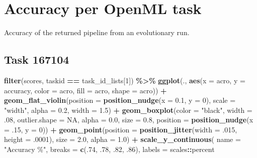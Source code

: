 \documentclass[
]{book}
\newenvironment{Shaded}{\begin{snugshade}}{\end{snugshade}}
\newcommand{\AttributeTok}[1]{\textcolor[rgb]{0.13,0.29,0.53}{#1}}
\newcommand{\ConstantTok}[1]{\textcolor[rgb]{0.56,0.35,0.01}{#1}}
\newcommand{\DecValTok}[1]{\textcolor[rgb]{0.00,0.00,0.81}{#1}}
\newcommand{\FloatTok}[1]{\textcolor[rgb]{0.00,0.00,0.81}{#1}}
\newcommand{\FunctionTok}[1]{\textcolor[rgb]{0.13,0.29,0.53}{\textbf{#1}}}
\newcommand{\NormalTok}[1]{#1}
\newcommand{\SpecialCharTok}[1]{\textcolor[rgb]{0.81,0.36,0.00}{\textbf{#1}}}
\newcommand{\StringTok}[1]{\textcolor[rgb]{0.31,0.60,0.02}{#1}}
\begin{document}
\hypertarget{accuracy-per-openml-task}{%
\section{Accuracy per OpenML task}\label{accuracy-per-openml-task}}

Accuracy of the returned pipeline from an evolutionary run.

\hypertarget{task-167104}{%
\subsection{Task 167104}\label{task-167104}}

\begin{Shaded}
\begin{Highlighting}[]
\FunctionTok{filter}\NormalTok{(scores, taskid }\SpecialCharTok{==}\NormalTok{ task\_id\_lists[}\DecValTok{1}\NormalTok{]) }\SpecialCharTok{\%\textgreater{}\%}
  \FunctionTok{ggplot}\NormalTok{(., }\FunctionTok{aes}\NormalTok{(}\AttributeTok{x =}\NormalTok{ acro, }\AttributeTok{y =}\NormalTok{ accuracy, }\AttributeTok{color =}\NormalTok{ acro,}
                \AttributeTok{fill =}\NormalTok{ acro, }\AttributeTok{shape =}\NormalTok{ acro)) }\SpecialCharTok{+}
  \FunctionTok{geom\_flat\_violin}\NormalTok{(}\AttributeTok{position =} \FunctionTok{position\_nudge}\NormalTok{(}\AttributeTok{x =} \FloatTok{0.1}\NormalTok{, }\AttributeTok{y =} \DecValTok{0}\NormalTok{),}
                   \AttributeTok{scale =} \StringTok{"width"}\NormalTok{, }\AttributeTok{alpha =} \FloatTok{0.2}\NormalTok{, }\AttributeTok{width =} \FloatTok{1.5}\NormalTok{) }\SpecialCharTok{+}
  \FunctionTok{geom\_boxplot}\NormalTok{(}\AttributeTok{color =} \StringTok{"black"}\NormalTok{, }\AttributeTok{width =}\NormalTok{ .}\DecValTok{08}\NormalTok{, }\AttributeTok{outlier.shape =} \ConstantTok{NA}\NormalTok{, }\AttributeTok{alpha =} \FloatTok{0.0}\NormalTok{,}
               \AttributeTok{size =} \FloatTok{0.8}\NormalTok{, }\AttributeTok{position =} \FunctionTok{position\_nudge}\NormalTok{(}\AttributeTok{x =}\NormalTok{ .}\DecValTok{15}\NormalTok{, }\AttributeTok{y =} \DecValTok{0}\NormalTok{)) }\SpecialCharTok{+}
  \FunctionTok{geom\_point}\NormalTok{(}\AttributeTok{position =} \FunctionTok{position\_jitter}\NormalTok{(}\AttributeTok{width =}\NormalTok{ .}\DecValTok{015}\NormalTok{, }\AttributeTok{height =}\NormalTok{ .}\DecValTok{0001}\NormalTok{),}
             \AttributeTok{size =} \FloatTok{2.0}\NormalTok{, }\AttributeTok{alpha =} \FloatTok{1.0}\NormalTok{) }\SpecialCharTok{+}
  \FunctionTok{scale\_y\_continuous}\NormalTok{(}
    \AttributeTok{name =} \StringTok{"Accuracy \%"}\NormalTok{,}
    \AttributeTok{breaks =} \FunctionTok{c}\NormalTok{(.}\DecValTok{74}\NormalTok{, .}\DecValTok{78}\NormalTok{, .}\DecValTok{82}\NormalTok{, .}\DecValTok{86}\NormalTok{),}
    \AttributeTok{labels =}\NormalTok{ scales}\SpecialCharTok{::}\NormalTok{percent}


\end{Highlighting}
\end{Shaded}
\end{document}
